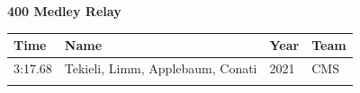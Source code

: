 \noindent\begin{minipage}[t]{0.98\textwidth}
\centering
\textbf{\textcolor{teamprimary}{400 Medley Relay}}\par
\vspace{0.5em}
\centering
\small
\renewcommand{\arraystretch}{1.0}
\setlength{\tabcolsep}{4pt}
\begin{tabular}{@{}p{2.7cm}p{4.3cm}p{1.6cm}p{2.7cm}@{}}
\toprule
\textbf{Time} & \textbf{Name} & \textbf{Year} & \textbf{Team} \\
\midrule
3:17.68 & Tekieli, Limm, Applebaum, Conati & 2021 & CMS \\
\bottomrule
\vspace{0.5em}
\end{tabular}
\end{minipage}
